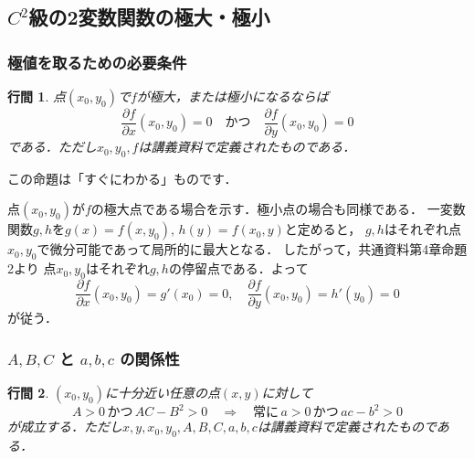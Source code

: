 \documentclass{jsarticle}
\makeatletter
\renewenvironment{proof}[1][\proofname]{\par
        \pushQED{\qed}
        \normalfont
        \topsep6\p@\@plus6\p@ \trivlist
        \item[\hskip\labelsep{\bfseries #1}\@addpunct{\bfseries}]\ignorespaces
    }{%
        \popQED\endtrivlist\@endpefalse
    }
\renewcommand{\proofname}{\underline{証明.}}
\newtheorem{proposition}{行間}
\makeatother
\begin{document}
\subsection{$C^2$級の2変数関数の極大・極小}

\subsubsection{極値を取るための必要条件}
\begin{screen}
    \begin{proposition}
        点$(x_0, y_0)$で$f$が極大，または極小になるならば
        \begin{equation}
            \frac{\partial f}{\partial x}(x_0, y_0) = 0
            \quad \mbox{かつ} \quad
            \frac{\partial f}{\partial y}(x_0, y_0) = 0
        \end{equation}
        である．ただし$x_0, y_0, f$は講義資料で定義されたものである．
    \end{proposition}
\end{screen}

この命題は「すぐにわかる」ものです．

\begin{proof}
    点$(x_0, y_0)$が$f$の極大点である場合を示す．極小点の場合も同様である．
    一変数関数$g, h$を$g(x) = f(x, y_0),\,h(y) = f(x_0, y)$と定めると，
    $g, h$はそれぞれ点$x_0, y_0$で微分可能であって局所的に最大となる．
    したがって，共通資料第4章命題2より
    点$x_0, y_0$はそれぞれ$g, h$の停留点である．よって
    \begin{equation}
        \frac{\partial f}{\partial x}(x_0, y_0) = g'(x_0) = 0
        ,\quad
        \frac{\partial f}{\partial y}(x_0, y_0) = h'(y_0) = 0
    \end{equation}
    が従う．
\end{proof}

\subsubsection{$A, B, C$ と $a, b, c$ の関係性}
\begin{screen}
    \begin{proposition}
        $(x_0, y_0)$に十分近い任意の点$(x, y)$に対して
        \begin{equation}
            A > 0
            \,\mbox{かつ}\,
            AC - B^2 > 0
            \quad \Longrightarrow \quad
            \mbox{常に}\,
            a > 0
            \,\mbox{かつ}\,
            ac - b^2 > 0
        \end{equation}
        が成立する．ただし$x, y, x_0, y_0, A, B, C, a, b, c$は講義資料で定義されたものである．
    \end{proposition}
\end{screen}
\end{document}
